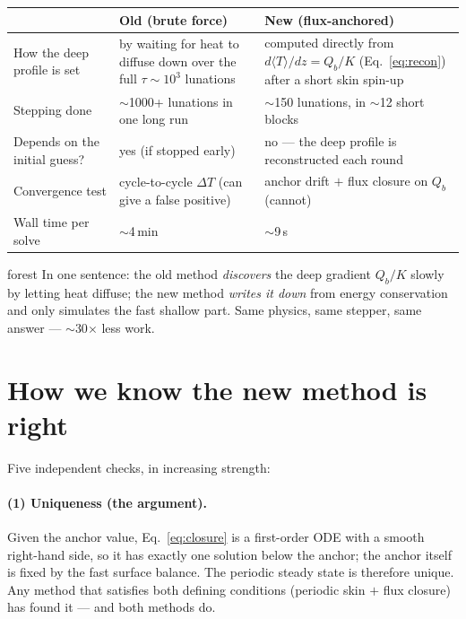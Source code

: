 \documentclass[11pt]{article}
\newcommand{\Tm}{\langle T\rangle}
\begin{document}
\begin{center}\small
\begin{tabular}{@{}p{4.4cm}p{5.3cm}p{5.3cm}@{}}
\toprule
 & \textbf{Old (brute force)} & \textbf{New (flux-anchored)} \\
\midrule
How the deep profile is set & by waiting for heat to diffuse down over the full $\tau\sim10^3$ lunations & computed directly from $d\Tm/dz=Q_b/K$ (Eq.~\eqref{eq:recon}) after a short skin spin-up \\
Stepping done & $\sim$1000+ lunations in one long run & $\sim$150 lunations, in $\sim$12 short blocks \\
Depends on the initial guess? & yes (if stopped early) & no --- the deep profile is reconstructed each round \\
Convergence test & cycle-to-cycle $\Delta T$ (can give a false positive) & anchor drift $+$ flux closure on $Q_b$ (cannot) \\
Wall time per solve & $\sim$4\,min & $\sim$9\,s \\
\bottomrule
\end{tabular}
\end{center}

\begin{kbox}{forest}
In one sentence: the old method \emph{discovers} the deep gradient $Q_b/K$ slowly
by letting heat diffuse; the new method \emph{writes it down} from energy
conservation and only simulates the fast shallow part. Same physics, same
stepper, same answer --- $\sim$30$\times$ less work.
\end{kbox}

\section{How we know the new method is right}
Five independent checks, in increasing strength:

\paragraph{(1) Uniqueness (the argument).} Given the anchor value,
Eq.~\eqref{eq:closure} is a first-order ODE with a smooth right-hand side, so it
has exactly one solution below the anchor; the anchor itself is fixed by the
fast surface balance. The periodic steady state is therefore unique. Any method
that satisfies both defining conditions (periodic skin $+$ flux closure) has
found it --- and both methods do.
\end{document}
